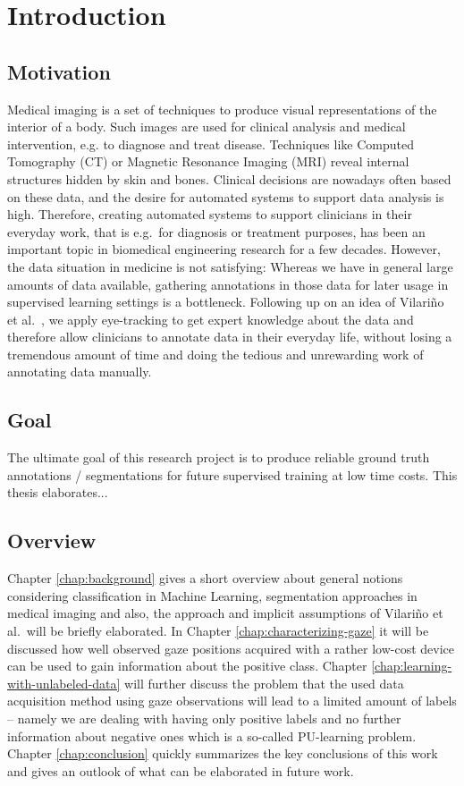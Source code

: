 \chapter{Introduction}
\label{chap:introduction}

\section{Motivation}
      Medical imaging is a set of techniques to produce visual representations of the interior of a body. 
      Such images are used for clinical analysis and medical intervention, e.g. to diagnose and treat disease. 
      Techniques like Computed Tomography (CT) or Magnetic Resonance Imaging (MRI) reveal internal structures hidden by skin and bones. 
      Clinical decisions are nowadays often based on these data, and the desire for automated systems to support data analysis is high. 
      Therefore, creating automated systems to support clinicians in their everyday work, that is e.g.\ for diagnosis or treatment purposes, has been an important topic in biomedical engineering research for a few decades.
      However, the data situation in medicine is not satisfying: 
      Whereas we have in general large amounts of data available, gathering annotations in those data for later usage in supervised learning settings is a bottleneck. 
      Following up on an idea of Vilari\~no et al.\ \cite{vilarino2007automatic}, we apply eye-tracking to get expert knowledge about the data and therefore allow clinicians to annotate data in their everyday life, without losing a tremendous amount of time and doing the tedious and unrewarding work of annotating data manually.
  
\section{Goal}
The ultimate goal of this research project is to produce reliable ground truth annotations / segmentations for future supervised training at low time costs. 
This thesis elaborates... 

\section{Overview}
Chapter \ref{chap:background} gives a short overview about general notions considering classification in Machine Learning, segmentation approaches in medical imaging and also, the approach and implicit assumptions of Vilari\~no et al.\ will be briefly elaborated. In Chapter \ref{chap:characterizing-gaze} it will be discussed how well observed gaze positions acquired with a rather low-cost device can be used to gain information about the positive class. Chapter \ref{chap:learning-with-unlabeled-data} will further discuss the problem that the used data acquisition method using gaze observations will lead to a limited amount of labels -- namely we are dealing with having only positive labels and no further information about negative ones which is a so-called PU-learning problem. 
Chapter \ref{chap:conclusion} quickly summarizes the key conclusions of this work and gives an outlook of what can be elaborated in future work.

